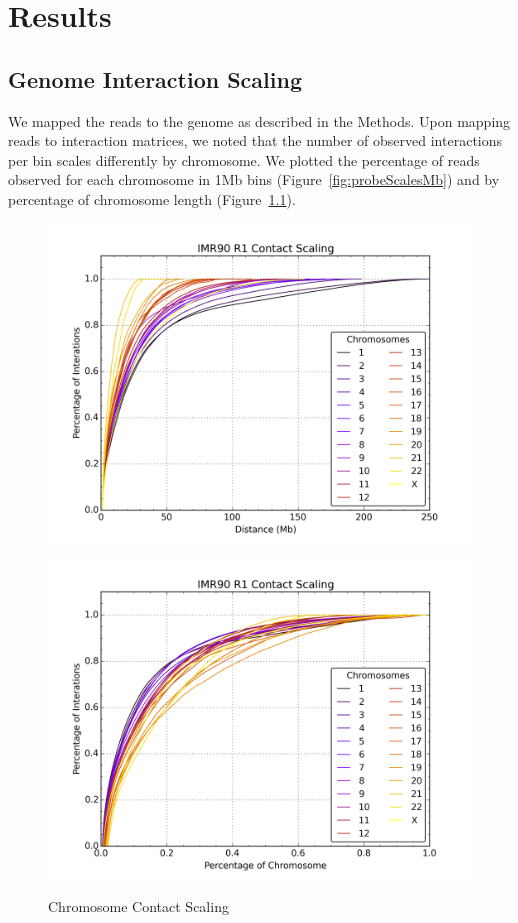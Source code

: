 \chapter{Results}

\section*{Genome Interaction Scaling}
We mapped the reads to the genome as described in the Methods.  Upon mapping reads to interaction matrices, we noted that the number
of observed interactions per bin scales differently by chromosome.  We plotted the percentage of reads observed for each chromosome
in 1Mb bins (Figure~\ref{fig:probeScalesMb}) and by percentage of chromosome length (Figure~\ref{fig:probeScalesPercent}).

\begin{figure}[H]
  \caption{Chromosome Contact Scaling}
  \noindent%
  \begin{minipage}[b]{0.45\textwidth}\label{fig:probeScalesMb}
    \includegraphics[width=\linewidth]{./figures/results/probeScalesMb.png}
  \end{minipage}%
  \hfill
  \begin{minipage}[b]{0.45\linewidth}\label{fig:probeScalesPercent}
    \includegraphics[width=\textwidth]{./figures/results/probeScalesPercent.png}

\end{minipage}
\end{figure}
